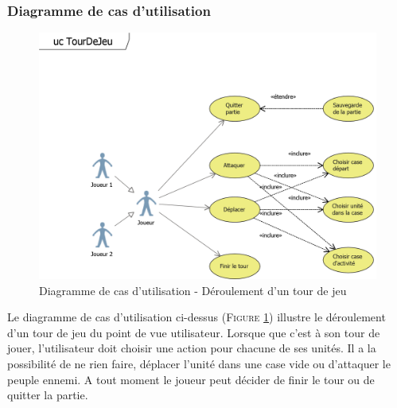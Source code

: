 \documentclass[a4paper,11pt]{article}
\begin{document}
		\subsubsection{Diagramme de cas d'utilisation}
			\begin{figure}[ht!]
				\includegraphics{ucTourDeJeu.png}
				\caption{Diagramme de cas d'utilisation - Déroulement d'un tour de jeu}
				\label{fig:uctour}
			\end{figure}
			\vspace*{1cm}
			Le diagramme de cas d'utilisation ci-dessus (\textsc{Figure \ref{fig:uctour}}) illustre le déroulement d'un tour de jeu du point de vue utilisateur. Lorsque que c'est à son tour de jouer, l'utilisateur doit choisir une action pour chacune de ses unités. Il a la possibilité de ne rien faire, déplacer l'unité dans une case vide ou d'attaquer le peuple ennemi. A tout moment le joueur peut décider de finir le tour ou de quitter la partie.
			\newpage
\end{document}
